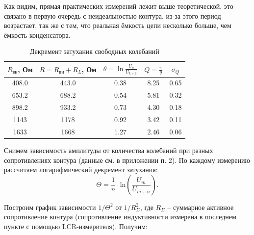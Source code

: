 \documentclass[a4paper,12pt]{extarticle}
\begin{document}
Как видим, прямая практических измерений лежит выше теоретической, это связано в первую очередь с неидеальностью контура, из-за этого период возрастает, так же с тем, что реальная ёмкость цепи несколько больше, чем ёмкость конденсатора.

\begin{table}[h]
        \centering
        \begin{tabular}{|c|c|c|c|c|}
                \hline
                $R_{\text{вн}}$, Ом & $R = R_{\text{вн}} + R_L$, Ом& $\theta = \ln \frac{U_k}{U_{k+1}}$ & $Q = \frac{\pi}{\theta}$ & $\sigma_{Q}$ \\ \hline
                  408.0 & 443.0 & 0.38 & 8.25 & 0.65 \\ \hline
                653.2 & 688.2 & 0.54 & 5.81 & 0.32  \\ \hline
                898.2 & 933.2 & 0.73 & 4.30 & 0.18 \\ \hline
                1143 & 1178 & 0.92 & 3.42 & 0.11 \\ \hline
                1633 & 1668 & 1.27 & 2.46 & 0.06 \\ \hline
        \end{tabular}
        \caption{Декремент затухания свободных колебаний}
\end{table}


Снимем зависимость амплитуды от количества колебаний при разных сопротивлениях контура (данные см. в приложении п. 2). По каждому измерению рассчитаем логарифмический декремент затухания:
\begin{equation}
    \Theta = \frac{1}{n} \cdot \text{ln}(\frac{U_m}{U_{m+n}}).
\end{equation}

Построим график зависимости $1/\Theta^2$ от $1/R_\Sigma ^2$, где $R_\Sigma$ -- суммарное активное сопротивление контура (сопротивление индуктивности измерена в последнем пункте с помощью LCR-измерителя). Получим:
\end{document}
